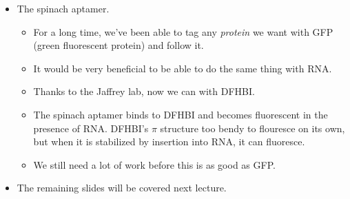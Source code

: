 \documentclass[../notes.tex]{subfiles}
\begin{document}
\begin{itemize}
\begin{itemize}
\begin{itemize}
        \end{itemize}
    \end{itemize}
    \item The spinach aptamer.
    \begin{itemize}
        \item For a long time, we've been able to tag any \emph{protein} we want with GFP (green fluorescent protein) and follow it.
        \item It would be very beneficial to be able to do the same thing with RNA.
        \item Thanks to the Jaffrey lab, now we can with DFHBI.
        \item The spinach aptamer binds to DFHBI and becomes fluorescent in the presence of RNA. DFHBI's $\pi$ structure too bendy to flouresce on its own, but when it is stabilized by insertion into RNA, it can fluoresce.
        \item We still need a lot of work before this is as good as GFP.
    \end{itemize}
    \item The remaining slides will be covered next lecture.
\end{itemize}
\end{document}
